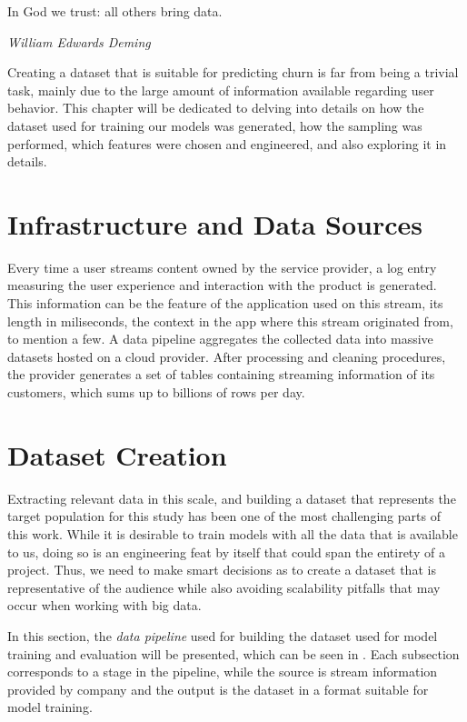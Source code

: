 \documentclass{kththesis}
\begin{document}
\epigraph{In God we trust: all others bring data.}{\textit{William Edwards Deming}}

Creating a dataset that is suitable for predicting churn is far from being a trivial task, mainly due to the large amount of information available regarding user behavior. This chapter will be dedicated to delving into details on how the dataset used for training our models was generated, how the sampling was performed, which features were chosen and engineered, and also exploring it in details.

\section{Infrastructure and Data Sources}

Every time a user streams content owned by the service provider, a log entry measuring the user experience and interaction with the product is generated. This information can be the feature of the application used on this stream, its length in miliseconds, the context in the app where this stream originated from, to mention a few. A data pipeline aggregates the collected data into massive datasets hosted on a cloud provider. After processing and cleaning procedures, the provider generates a set of tables containing streaming information of its customers, which sums up to billions of rows per day. 

\section{Dataset Creation}

Extracting relevant data in this scale, and building a dataset that represents the target population for this study has been one of the most challenging parts of this work. While it is desirable to train models with all the data that is available to us, doing so is an engineering feat by itself that could span the entirety of a project. Thus, we need to make smart decisions as to create a dataset that is representative of the audience while also avoiding scalability pitfalls that may occur when working with big data.

In this section, the \emph{data pipeline} used for building the dataset used for model training and evaluation will be presented, which can be seen in . Each subsection corresponds to a stage in the pipeline, while the source is stream information provided by company and the output is the dataset in a format suitable for model training.
\end{document}

